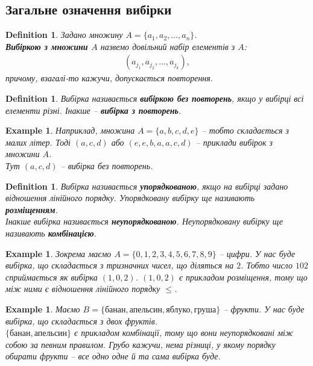 \documentclass[a4paper, 14pt]{extarticle}
\theoremstyle{theoremdd}
\theoremstyle{theoremdd}
\newtheorem{definition}[theorem]{Definition}
\theoremstyle{theoremdd}
\theoremstyle{theoremdd}
\theoremstyle{theoremdd}
\newtheorem{example}[theorem]{Example}
\theoremstyle{theoremdd}
\theoremstyle{theoremdd}
\theoremstyle{theoremdd}
\theoremstyle{theoremdd}
\theoremstyle{theoremdd}
\theoremstyle{theoremdd}
\theoremstyle{theoremdd}
\theoremstyle{theoremdd}
\theoremstyle{theoremdd}
\theoremstyle{theoremdd}
\begin{document}
\subsection{Загальне означення вибірки}
\begin{definition}
Задано множину $A = \{a_1,a_2,\dots,a_n\}$.\\
\textbf{Вибіркою з множини $A$} назвемо довільний набір елементів з $A$:
\begin{align*}
(a_{j_1},a_{j_2},\dots,a_{j_k}),
\end{align*}
причому, взагалі-то кажучи, допускається повторення.
\end{definition}

\begin{definition}
Вибірка називається \textbf{вибіркою без повторень}, якщо у вибірці всі елементи різні. Інакше -- \textbf{вибірка з повторень}.
\end{definition}

\begin{example}
Наприклад, множина $A = \{a,b,c,d,e\}$ -- тобто складається з малих літер. Тоді $(a,c,d)$ або $(e,e,b,a,a,c,d)$ -- приклади вибірок з множини $A$.\\
Тут $(a,c,d)$ -- вибірка без повторень.
\end{example}

\begin{definition}
Вибірка називається \textbf{упорядкованою}, якщо на вибірці задано відношення лінійного порядку. Упорядковану вибірку ще називають \textbf{розміщенням}.\\
Інакше вибірка називається \textbf{неупорядкованою}. Неупорядковану вибірку ще називають \textbf{комбінацією}.
\end{definition}

\begin{example}
Зокрема маємо $A = \{0,1,2,3,4,5,6,7,8,9\}$ -- цифри. У нас буде вибірка, що складається з тризначних чисел, що діляться на $2$. Тобто число $102$ сприймається як вибірка $(1,0,2)$.
$(1,0,2)$ є прикладом розміщення, тому що між ними є відношення лінійного порядку $\leq$.
\end{example}

\begin{example}
Маємо $B = \{\text{банан},\text{апельсин},\text{яблуко},\text{груша}\}$ -- фрукти. У нас буде вибірка, що складається з двох фруктів.\\
$\{ \text{банан}, \text{апельсин} \}$ є прикладом комбінації, тому що вони неупорядковані між собою за певним правилом. Грубо кажучи, нема різниці, у якому порядку обирати фрукти -- все одно одне й та сама вибірка буде.
\end{example}
\end{document}
